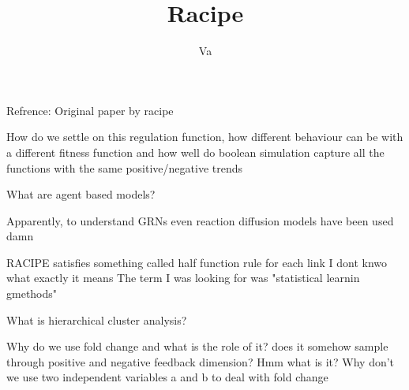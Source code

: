 \documentclass{article}
\title{Racipe}
\author{Va}
\begin{document}
\maketitle
Refrence: Original paper by racipe

How do we settle on this regulation function, how different behaviour can be with a different fitness function and how well do boolean simulation capture all the functions with the same positive/negative trends

What are agent based models?

Apparently, to understand GRNs even reaction diffusion models have been used damn 

RACIPE satisfies something called half function rule for each link I dont knwo what exactly it means
 The term I was looking for was "statistical learnin gmethods"

 What is hierarchical cluster analysis?

 Why do we use fold change and what is the role of it? does it somehow sample through positive and negative feedback dimension? Hmm what is it? Why don't we use two independent variables a and b to deal with fold change
\end{document}
